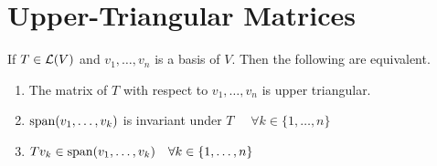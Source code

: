 \section{Upper-Triangular Matrices}

\setcounter{thm}{38}
\begin{thm} 
  \label{conditions for upper-triangular matrix}
  If $T \in \mathcal{L} (V)$ and $v_1, \dots, v_n$ is a basis of $V$. Then the following are equivalent.
  \begin{enumerate}[label=(\alph*)]
    \item The matrix of $T$ with respect to $v_1, \dots, v_n$ is upper triangular.
    \item $\operatorname{span} (v_1, \dots, v_k)$ is invariant under $T$ $\quad \forall k \in \{ 1, \dots, n\}$
    \item $T v_k \in \operatorname{span} (v_1, \dots, v_k) \quad \forall k \in \{1, \dots, n\}$
  \end{enumerate}
\end{thm}

